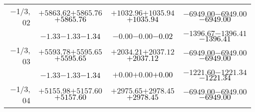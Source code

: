 \documentclass[compress]{beamer}
\begin{document}
\begin{frame}
{\begin{tabular}{r | c | c | c}
$-$1/3, 02 & $+5863.62$\hspace{0.1 cm}$+5865.76$\hspace{0.1 cm}\textcolor{black}{$+5865.76$} & $+1032.96$\hspace{0.1 cm}$+1035.94$\hspace{0.1 cm}\textcolor{black}{$+1035.94$} & $-6949.00$\hspace{0.1 cm}$-6949.00$\hspace{0.1 cm}\textcolor{black}{$-6949.00$} \\
           & $-1.33$\hspace{0.1 cm}$-1.33$\hspace{0.1 cm}\textcolor{black}{$-1.34$} & $-0.00$\hspace{0.1 cm}$-0.00$\hspace{0.1 cm}\textcolor{black}{$-0.02$} & $-1396.67$\hspace{0.1 cm}$-1396.41$\hspace{0.1 cm}\textcolor{black}{$-1396.41$} \\
$-$1/3, 03 & $+5593.78$\hspace{0.1 cm}$+5595.65$\hspace{0.1 cm}\textcolor{black}{$+5595.65$} & $+2034.21$\hspace{0.1 cm}$+2037.12$\hspace{0.1 cm}\textcolor{black}{$+2037.12$} & $-6949.00$\hspace{0.1 cm}$-6949.00$\hspace{0.1 cm}\textcolor{black}{$-6949.00$} \\
           & $-1.33$\hspace{0.1 cm}$-1.33$\hspace{0.1 cm}\textcolor{black}{$-1.34$} & $+0.00$\hspace{0.1 cm}$+0.00$\hspace{0.1 cm}\textcolor{black}{$+0.00$} & $-1221.60$\hspace{0.1 cm}$-1221.34$\hspace{0.1 cm}\textcolor{black}{$-1221.34$} \\
$-$1/3, 04 & $+5155.98$\hspace{0.1 cm}$+5157.60$\hspace{0.1 cm}\textcolor{black}{$+5157.60$} & $+2975.65$\hspace{0.1 cm}$+2978.45$\hspace{0.1 cm}\textcolor{black}{$+2978.45$} & $-6949.00$\hspace{0.1 cm}$-6949.00$\hspace{0.1 cm}\textcolor{black}{$-6949.00$} \\

\end{tabular}}
\end{frame}
\end{document}
